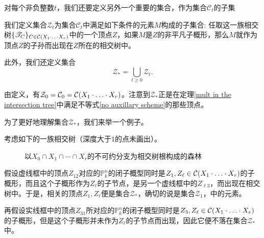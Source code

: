 对每个非负整数$t$，我们还要定义另外一个重要的集合，作为集合$\mathcal C_t$的子集

\begin{definition} \label{def of Z_s}
我们定义集合$\mathcal Z_t$为集合$\mathcal C_t$中满足如下条件的元素$M$构成的子集合: 任取这一族相交树$\{\mathscr T_C\}_{C\in\mathcal C(X_1\cdot\ldots\cdot X_r)}$中的一个顶点$Z$，如果$M$是$Z$的非平凡子概形，那么$M$就作为顶点$Z$的子孙而出现在$Z$所在的相交树中。

此外，我们还定义集合
\begin{equation}
\mathcal Z_*=\bigcup\limits_{t\geqslant0}\mathcal Z_t.
\end{equation}
\end{definition}

由定义，有$\mathcal Z_0=\mathcal C_0=\mathcal C(X_1\cdot\ldots\cdot X_r)$。注意到$\mathcal Z_*$正是在定理\ref{mult in the intersection tree}中满足不等式\eqref{no auxillary scheme}的那些顶点。

为了更好地理解集合$\mathcal Z_*$，我们来举一个例子。
\begin{example}
考虑如下的一族相交树（深度大于$1$的点未画出）。
\begin{figure}[H]
\centering
{}
\caption{以$X_0\cap X_1\cap\cdots\cap X_r$的不可约分支为相交树根构成的森林}
\end{figure}
假设虚线框中的顶点$Z_{12}$对应的$\mathbb{P}_k^n$的闭子概型同时是$Z_1, Z_{\ell}\in \mathcal{C}(X_1\cdot\ldots\cdot X_r)$的子概形，而且这个子概形作为$Z_{\ell}$的子节点，是另一个虚线框中的$Z_{\ell3}$，而出现在相交树中。于是，相关的顶点$Z_1, Z_{\ell}$便是集合$\mathcal Z_*$，确切的说是集合$\mathcal Z_1$，中的元素。

再假设实线框中的顶点$Z_{31}$所对应的$\mathbb{P}_k^n$的闭子概型同时是$Z_3, Z_{\ell}\in \mathcal{C}(X_1\cdot\ldots\cdot X_r)$的子概形，但是这个子概形并未作为$Z_{\ell}$的子节点而出现，因此它便不落在集合$\mathcal Z_*$中。
\end{example}

